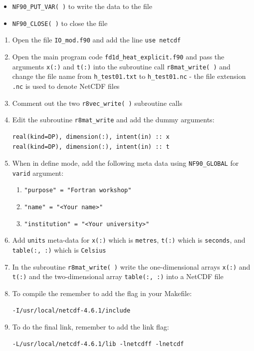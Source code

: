 \documentclass[12pt]{article}
\begin{document}
\begin{enumerate}
\begin{itemize}
\item\texttt{NF90\_PUT\_VAR( )} to write the data to the file
\item\texttt{NF90\_CLOSE( )} to close the file
\end{itemize}
\begin{enumerate}
\item Open the file \texttt{IO\_mod.f90} and add the line \texttt{use netcdf}
\item Open the main program code \texttt{fd1d\_heat\_explicit.f90} and pass the arguments \texttt{x(:)} and
  \texttt{t(:)} into the subroutine call \texttt{r8mat\_write( )} and change the file name from \texttt{h\_test01.txt}
  to \texttt{h\_test01.nc} - the file extension \texttt{.nc} is used to denote NetCDF files
\item Comment out the two \texttt{r8vec\_write( )} subroutine calls
\item Edit the subroutine \texttt{r8mat\_write} and add the dummy arguments:
\begin{verbatim}
real(kind=DP), dimension(:), intent(in) :: x
real(kind=DP), dimension(:), intent(in) :: t
\end{verbatim}
\item When in define mode, add the following meta data using \texttt{NF90\_GLOBAL} for \texttt{varid} argument:
  \begin{enumerate}
  \item\texttt{"purpose" = "Fortran workshop"}
  \item\texttt{"name" = "<Your name>"}
  \item\texttt{"institution" = "<Your university>"} 
  \end{enumerate}
\item Add \texttt{units} meta-data for \texttt{x(:)} which is \texttt{metres}, \texttt{t(:)} which is \texttt{seconds}, and
  \texttt{table(:, :)} which is \texttt{Celsius}
\item In the subroutine \texttt{r8mat\_write( )} write the one-dimensional arrays \texttt{x(:)} and \texttt{t(:)} and the
  two-dimensional array \texttt{table(:, :)} into a NetCDF file
\item To compile the remember to add the flag in your Makefile:
\begin{verbatim}
-I/usr/local/netcdf-4.6.1/include
\end{verbatim}
\item To do the final link, remember to add the link flag: 
\begin{verbatim}
-L/usr/local/netcdf-4.6.1/lib -lnetcdff -lnetcdf

\end{verbatim}
\end{enumerate}
\end{enumerate}
\end{document}
